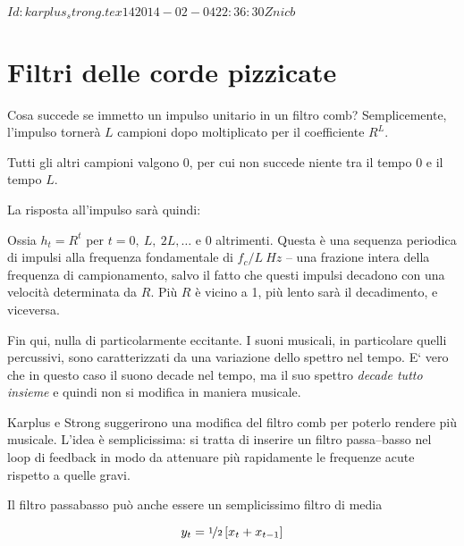 %
%
\svnInfo $Id: karplus_strong.tex 14 2014-02-04 22:36:30Z nicb $

\chapter{Filtri delle corde pizzicate}

Cosa succede se immetto un impulso unitario in un filtro comb?
Semplicemente, l'impulso torner\`a $L$ campioni dopo moltiplicato per il
coefficiente $R^L$.

Tutti gli altri campioni valgono $0$, per cui non succede niente tra il tempo
$0$ e il tempo $L$.

La risposta all'impulso sar\`a quindi:


Ossia $h_t = R^t$ per $t = 0,~L,~2L, \dots$ e $0$ altrimenti. Questa \`e una
sequenza periodica di impulsi alla frequenza fondamentale di $f_c / L~Hz$ -- una
frazione intera della frequenza di campionamento,
salvo il fatto che questi impulsi decadono con una velocit\`a determinata da $R$.
Pi\`u $R$ \`e vicino a 1, pi\`u lento sar\`a il decadimento, e viceversa.

Fin qui, nulla di particolarmente eccitante.
I suoni musicali, in particolare quelli percussivi,
sono caratterizzati da una variazione dello spettro nel tempo.
E` vero che in questo caso il suono decade nel tempo, ma il suo spettro
\emph{decade tutto insieme} e quindi non si modifica in maniera musicale.

Karplus e Strong suggerirono una modifica del filtro comb per poterlo rendere pi\`u musicale.
L'idea \`e semplicissima: si tratta di inserire un filtro passa--basso nel
loop di feedback in modo da attenuare pi\`u rapidamente le frequenze acute
rispetto a quelle gravi.

Il filtro passabasso pu\`o anche essere un semplicissimo filtro di media

\begin{equation}
				y_t = \nicefrac{1}{2} \left [ x_t + x_{t-1} \right ]
\end{equation}

